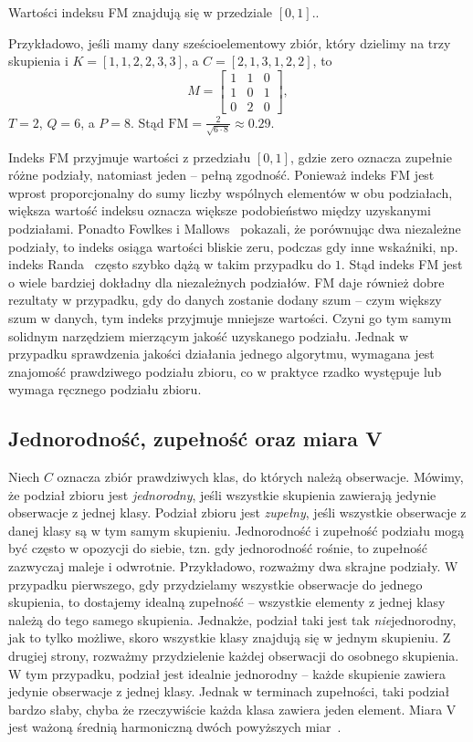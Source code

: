 \documentclass{praca1}
\begin{document}
Wartości indeksu FM znajdują się w przedziale $[0,1]$..

Przykładowo, jeśli mamy dany sześcioelementowy zbiór, który dzielimy na trzy skupienia i $K = [1, 1, 2, 2, 3, 3]$, a $C = [2, 1, 3, 1, 2, 2]$, to 
$$
M = \begin{bmatrix}
      1 & 1 & 0 \\
      1 & 0 & 1 \\
      0 & 2 & 0
     \end{bmatrix},
$$
$T = 2$, $Q = 6$, a $P = 8$. Stąd $\mathrm{FM} = \frac{2}{\sqrt{6\cdot 8}} \approx 0.29$.

Indeks FM przyjmuje wartości z przedziału $[0,1]$, gdzie zero oznacza zupełnie różne podziały, natomiast jeden -- pełną zgodność. Ponieważ indeks FM jest wprost proporcjonalny do sumy liczby wspólnych elementów w obu podziałach, większa wartość indeksu oznacza większe podobieństwo między uzyskanymi podziałami. Ponadto Fowlkes i Mallows~\cite{Fowlkes1983:fmindex} pokazali, że porównując dwa niezależne podziały, to indeks osiąga wartości bliskie zeru, podczas gdy inne wskaźniki, np. indeks Randa~\cite{Rand1971:objective} często szybko dążą w takim przypadku do $1$. Stąd indeks FM jest o wiele bardziej dokładny dla niezależnych podziałów. FM daje również dobre rezultaty w przypadku, gdy do danych zostanie dodany szum -- czym większy szum w danych, tym indeks przyjmuje mniejsze wartości. Czyni go tym samym solidnym narzędziem mierzącym jakość uzyskanego podziału. 
Jednak w przypadku sprawdzenia jakości działania jednego algorytmu, wymagana jest znajomość prawdziwego podziału zbioru, co w praktyce rzadko występuje lub wymaga ręcznego podziału zbioru.


\subsection{Jednorodność, zupełność oraz miara V}

Niech $C$ oznacza zbiór prawdziwych klas, do których należą obserwacje. Mówimy, że podział zbioru jest \emph{jednorodny}, jeśli wszystkie skupienia zawierają jedynie obserwacje z jednej klasy. Podział zbioru jest \emph{zupełny}, jeśli wszystkie obserwacje z danej klasy są w tym samym skupieniu. Jednorodność i zupełność podziału mogą być często w opozycji do siebie, tzn. gdy jednorodność rośnie, to zupełność zazwyczaj maleje i odwrotnie. Przykładowo, rozważmy dwa skrajne podziały. W przypadku pierwszego, gdy przydzielamy wszystkie obserwacje do jednego skupienia, to dostajemy idealną zupełność -- wszystkie elementy z jednej klasy należą do tego samego skupienia. Jednakże, podział taki jest tak \emph{nie}jednorodny, jak to tylko możliwe, skoro wszystkie klasy znajdują się w jednym skupieniu. Z drugiej strony, rozważmy przydzielenie każdej obserwacji do osobnego skupienia. W tym przypadku, podział jest idealnie jednorodny -- każde skupienie zawiera jedynie obserwacje z jednej klasy. Jednak w terminach zupełności, taki podział bardzo słaby, chyba że rzeczywiście każda klasa zawiera jeden element. Miara $\textrm{V}$ jest ważoną średnią harmoniczną dwóch powyższych miar~\cite{Rosenberg2007:vmeasure}.
\end{document}
